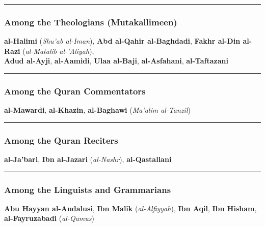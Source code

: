 \documentclass[
  a4paper,
  DIV=11,
  numbers=noendperiod]{scrartcl}
\begin{document}
\begin{center}\rule{0.5\linewidth}{0.5pt}\end{center}

\subsubsection{Among the Theologians
(Mutakallimeen)}\label{among-the-theologians-mutakallimeen}

\textbf{al-Halimi} (\emph{Shu'ab al-Iman}), \textbf{Abd al-Qahir
al-Baghdadi}, \textbf{Fakhr al-Din al-Razi} (\emph{al-Matalib
al-'Aliyah}),\\
\textbf{Adud al-Ayji}, \textbf{al-Aamidi}, \textbf{Ulaa al-Baji},
\textbf{al-Asfahani}, \textbf{al-Taftazani}

\begin{center}\rule{0.5\linewidth}{0.5pt}\end{center}

\subsubsection{Among the Quran
Commentators}\label{among-the-quran-commentators}

\textbf{al-Mawardi}, \textbf{al-Khazin}, \textbf{al-Baghawi}
(\emph{Ma'alim al-Tanzil})

\begin{center}\rule{0.5\linewidth}{0.5pt}\end{center}

\subsubsection{Among the Quran Reciters}\label{among-the-quran-reciters}

\textbf{al-Ja'bari}, \textbf{Ibn al-Jazari} (\emph{al-Nashr}),
\textbf{al-Qastallani}

\begin{center}\rule{0.5\linewidth}{0.5pt}\end{center}

\subsubsection{Among the Linguists and
Grammarians}\label{among-the-linguists-and-grammarians}

\textbf{Abu Hayyan al-Andalusi}, \textbf{Ibn Malik}
(\emph{al-Alfiyyah}), \textbf{Ibn Aqil}, \textbf{Ibn Hisham},
\textbf{al-Fayruzabadi} (\emph{al-Qamus})
\end{document}
